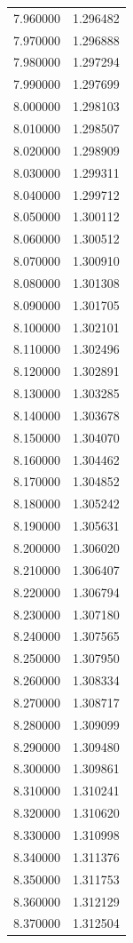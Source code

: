 \begin{tabular}{rr}
7.960000 & 1.296482 \\
7.970000 & 1.296888 \\
7.980000 & 1.297294 \\
7.990000 & 1.297699 \\
8.000000 & 1.298103 \\
8.010000 & 1.298507 \\
8.020000 & 1.298909 \\
8.030000 & 1.299311 \\
8.040000 & 1.299712 \\
8.050000 & 1.300112 \\
8.060000 & 1.300512 \\
8.070000 & 1.300910 \\
8.080000 & 1.301308 \\
8.090000 & 1.301705 \\
8.100000 & 1.302101 \\
8.110000 & 1.302496 \\
8.120000 & 1.302891 \\
8.130000 & 1.303285 \\
8.140000 & 1.303678 \\
8.150000 & 1.304070 \\
8.160000 & 1.304462 \\
8.170000 & 1.304852 \\
8.180000 & 1.305242 \\
8.190000 & 1.305631 \\
8.200000 & 1.306020 \\
8.210000 & 1.306407 \\
8.220000 & 1.306794 \\
8.230000 & 1.307180 \\
8.240000 & 1.307565 \\
8.250000 & 1.307950 \\
8.260000 & 1.308334 \\
8.270000 & 1.308717 \\
8.280000 & 1.309099 \\
8.290000 & 1.309480 \\
8.300000 & 1.309861 \\
8.310000 & 1.310241 \\
8.320000 & 1.310620 \\
8.330000 & 1.310998 \\
8.340000 & 1.311376 \\
8.350000 & 1.311753 \\
8.360000 & 1.312129 \\
8.370000 & 1.312504 \\

\end{tabular}
